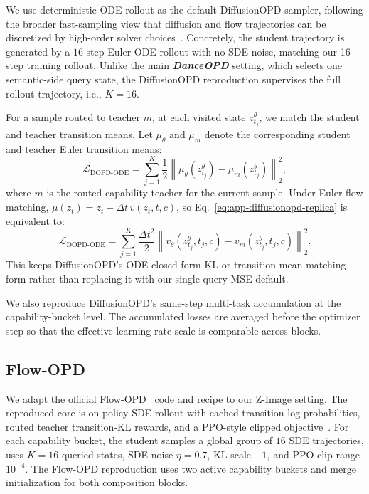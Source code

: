 \documentclass{llmxive}
\providecommand{\name}{\textsl{\textbf{DanceOPD}}\xspace}
\begin{document}
We use deterministic ODE rollout as the default DiffusionOPD sampler, following the broader fast-sampling view that diffusion and flow trajectories can be discretized by high-order solver choices~\cite{zhao2023unipc,zhang2022fast,lu2025dpm}. Concretely, the student trajectory is generated by a $16$-step Euler ODE rollout with no SDE noise, matching our 16-step training rollout. Unlike the main \name{} setting, which selects one semantic-side query state, the DiffusionOPD reproduction supervises the full rollout trajectory, i.e., $K{=}16$. 

For a sample routed to teacher $m$, at each visited state $z_{t_j}^{\theta}$, we match the student and teacher transition means. Let $\mu_\theta$ and $\mu_m$ denote the corresponding student and teacher Euler transition means:
\begin{equation}
  \mathcal{L}_{\mathrm{DOPD\text{-}ODE}}
  =\sum_{j=1}^{K}\frac{1}{2}
  \left\|\mu_{\theta}(z_{t_j}^{\theta})-
          \mu_m(z_{t_j}^{\theta})\right\|_2^2,
  \label{eq:app-diffusionopd-replica}
\end{equation}
where $m$ is the routed capability teacher for the current sample. Under Euler flow matching,
$\mu(z_t)=z_t-\Delta t\,v(z_t,t,c)$, so Eq.~\eqref{eq:app-diffusionopd-replica} is equivalent to:
\begin{equation}
  \mathcal{L}_{\mathrm{DOPD\text{-}ODE}}
  =\sum_{j=1}^{K}\frac{\Delta t^2}{2}
  \left\|v_{\theta}(z_{t_j}^{\theta},t_j,c)-
          v_m(z_{t_j}^{\theta},t_j,c)\right\|_2^2.
  \label{eq:app-diffusionopd-velocity}
\end{equation}
This keeps DiffusionOPD's ODE closed-form KL or transition-mean matching form rather than replacing it with our single-query MSE default.

We also reproduce DiffusionOPD's same-step multi-task accumulation at the capability-bucket level. The accumulated losses are averaged before the optimizer step so that the effective learning-rate scale is comparable across blocks.


\vspace{0.2cm}


\subsection{Flow-OPD}
\label{app:flowopd-reproduction}

We adapt the official Flow-OPD~\cite{fang2026flow} code and recipe to our Z-Image setting. The reproduced core is on-policy SDE rollout with cached transition log-probabilities, routed teacher transition-KL rewards, and a PPO-style clipped objective~\cite{schulman2017proximal,liu2026flow}. For each capability bucket, the student samples a global group of $16$ SDE trajectories, uses $K{=}16$ queried states, SDE noise $\eta{=}0.7$, KL scale $-1$, and PPO clip range $10^{-4}$. The Flow-OPD reproduction uses two active capability buckets and merge initialization for both composition blocks.
\end{document}

